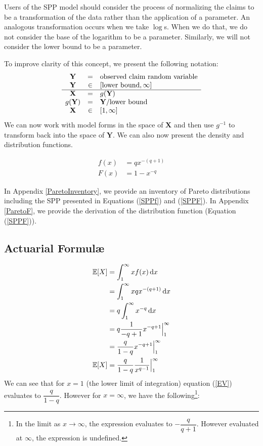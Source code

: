 \documentclass[]{article} %
\begin{document}
Users of the SPP model should consider the process of normalizing the claims to be a transformation of the data rather than the application of a parameter. An analogous transformation occurs when we take $\log$s. When we do that, we do not consider the base of the logarithm to be a parameter. Similarly, we will not consider the lower bound to be a parameter.

To improve clarity of this concept, we present the following notation:
\begin{eqnarray}
	\begin{array}{ccl}
		\mathbf{Y} & = & \text{observed claim random variable} \\ 
		\mathbf{Y}& \in &  [\text{lower bound}, \infty]\\
		\cline{1-3}
		\mathbf{X} & =  & g(\mathbf{Y})\\
		g(\mathbf{Y}) & =  & \mathbf{Y}/\text{lower bound}\\
		\mathbf{X}& \in &  [1, \infty]\\
	\end{array} 
\end{eqnarray}
We can now work with model forms in the space of $\mathbf{X}$ and then use $g^{-1}$ to transform back into the space of $\mathbf{Y}$. We can also now present the density and distribution functions.

\begin{align}
		f(x) & =  qx^{-(q+1)}\label{SPPf}\\
		F(x) & =  1 - x^{-q}\label{SPPF}
\end{align}

In Appendix \ref{ParetoInventory}, we provide an inventory of Pareto distributions including the SPP presented in Equations (\ref{SPPf}) and (\ref{SPPF}). In  Appendix \ref{ParetoF}, we provide the derivation of the distribution function (Equation (\ref{SPPF})).

\subsection{Actuarial Formul\ae}
\begin{align}
	\mathbb{E}[X] & = \int_{1}^{\infty}x f(x) \operatorname{d \!} x \nonumber\\
		& = \int_{1}^{\infty}xqx^{-(q+1)} \operatorname{d \!} x\nonumber\\
		& = q \int_{1}^{\infty}x^{-q} \operatorname{d \!} x\nonumber\\
		& = q \frac{1}{-q+1} x^{-q+1} \Big|_{1}^{\infty}\nonumber\\
		& = \frac{q}{1-q} x^{-q+1} \Big|_{1}^{\infty}\nonumber\\
	\mathbb{E}[X] 	& = \frac{q}{1-q} \dfrac{1}{x^{q-1}} \Big|_{1}^{\infty}\label{EV}
\end{align}
We can see that for $x = 1$ (the lower limit of integration) equation (\ref{EV}) evaluates to $\dfrac{q}{1-q}$. However for $x = \infty$, we have the following\footnote{In the limit as $x\to\infty$, the expression evaluates to  $-\dfrac{q}{q+1}$. However evaluated at $\infty$, the expression is undefined.}:
\end{document}
